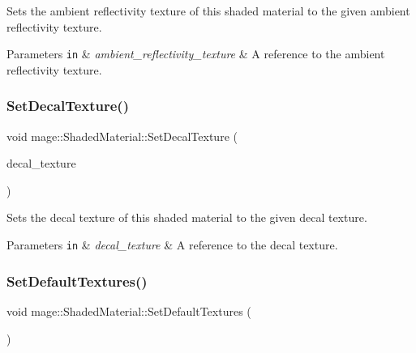 Sets the ambient reflectivity texture of this shaded material to the given ambient reflectivity texture.


\begin{DoxyParams}[1]{Parameters}
\mbox{\tt in}  & {\em ambient\+\_\+reflectivity\+\_\+texture} & A reference to the ambient reflectivity texture. \\
\hline
\end{DoxyParams}
\hypertarget{structmage_1_1_shaded_material_a4acb72c80dfc51dacb5cba6621234685}{}\label{structmage_1_1_shaded_material_a4acb72c80dfc51dacb5cba6621234685} 
\subsubsection{\texorpdfstring{Set\+Decal\+Texture()}{SetDecalTexture()}}
{\footnotesize\ttfamily void mage\+::\+Shaded\+Material\+::\+Set\+Decal\+Texture (\begin{DoxyParamCaption}\item[{\hyperlink{namespacemage_a1e01ae66713838a7a67d30e44c67703e}{Shared\+Ptr}$<$ \hyperlink{classmage_1_1_texture}{Texture} $>$}]{decal\+\_\+texture }\end{DoxyParamCaption})}

Sets the decal texture of this shaded material to the given decal texture.


\begin{DoxyParams}[1]{Parameters}
\mbox{\tt in}  & {\em decal\+\_\+texture} & A reference to the decal texture. \\
\hline
\end{DoxyParams}
\hypertarget{structmage_1_1_shaded_material_afbd4b9d4a2f348124c08c005a712477d}{}\label{structmage_1_1_shaded_material_afbd4b9d4a2f348124c08c005a712477d} 
\subsubsection{\texorpdfstring{Set\+Default\+Textures()}{SetDefaultTextures()}}
{\footnotesize\ttfamily void mage\+::\+Shaded\+Material\+::\+Set\+Default\+Textures (\begin{DoxyParamCaption}{ }\end{DoxyParamCaption})\hspace{0.3cm}{\ttfamily [private]}}

